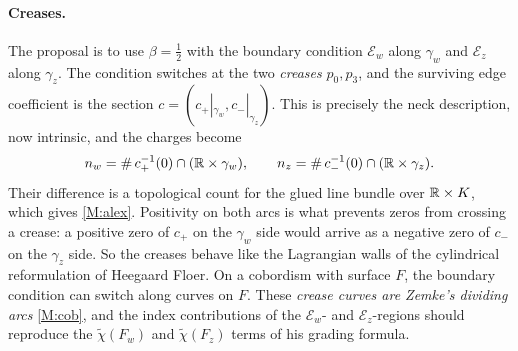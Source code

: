 \paragraph{Creases.}  The proposal is to use $\beta=\tfrac12$ with the boundary condition $\mathcal E_w$ along $\gamma_w$ and $\mathcal E_z$ along
$\gamma_z$.  The condition switches at the two \emph{creases} $p_0,p_3$, and the surviving edge coefficient is the section
$c=(c_+|_{\gamma_w},c_-|_{\gamma_z})$.  This is precisely the neck description, now intrinsic, and the charges become
\[
n_w=\#\,c_+^{-1}(0)\cap(\mathbb{R}\times\gamma_w),\qquad n_z=\#\,c_-^{-1}(0)\cap(\mathbb{R}\times\gamma_z).
\]
Their difference is a topological count for the glued line bundle over $\mathbb{R}\times K$, which gives \ref{M:alex}.  Positivity on
both arcs is what prevents zeros from crossing a crease: a positive zero of $c_+$ on the $\gamma_w$ side would arrive as a
negative zero of $c_-$ on the $\gamma_z$ side.  So the creases behave like the Lagrangian walls of the cylindrical
reformulation of Heegaard Floer.  On a cobordism with surface $F$, the boundary condition can switch along curves on
$F$.  These \emph{crease curves are Zemke's dividing arcs} \ref{M:cob}, and the index contributions of the
$\mathcal E_w$- and $\mathcal E_z$-regions should reproduce the $\tilde\chi(F_w)$ and $\tilde\chi(F_z)$ terms of his grading formula.

